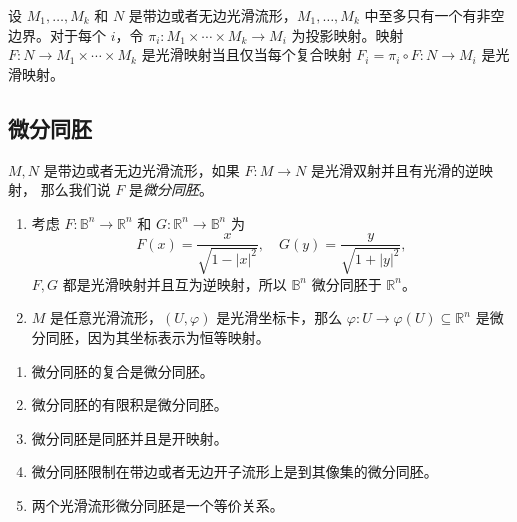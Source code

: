 \documentclass[fontset=none]{Notes}
\begin{document}
\begin{proposition}
  设 $M_1,\dots,M_k$ 和 $N$ 是带边或者无边光滑流形，$M_1,\dots,M_k$
  中至多只有一个有非空边界。对于每个 $i$，令 $\pi_i:M_1\times\cdots\times M_k\to M_i$
  为投影映射。映射 $F:N\to M_1\times\cdots\times M_k$ 是光滑映射当且仅当每个复合映射
  $F_i=\pi_i\circ F:N\to M_i$ 是光滑映射。
\end{proposition}

\subsection{微分同胚}

$M,N$ 是带边或者无边光滑流形，如果 $F:M\to N$ 是光滑双射并且有光滑的逆映射，
那么我们说 $F$ 是\emph{微分同胚}。

\begin{example}[微分同胚]
  \mbox{}
  \begin{enumerate}
    \item 考虑 $F:\mathbb{B}^n\to\mathbb{R}^n$ 和 $G:\mathbb{R}^n\to\mathbb{B}^n$
    为
    \[
      F(x)=\frac{x}{\sqrt{1-|x|^2}},\quad G(y)=\frac{y}{\sqrt{1+|y|^2}},
    \]
    $F,G$ 都是光滑映射并且互为逆映射，所以 $\mathbb{B}^n$ 微分同胚于 $\mathbb{R}^n$。
    \item $M$ 是任意光滑流形，$(U,\varphi)$ 是光滑坐标卡，那么 $\varphi:U\to\varphi(U)\subseteq\mathbb{R}^n$
    是微分同胚，因为其坐标表示为恒等映射。
  \end{enumerate}
\end{example}

\begin{proposition}[微分同胚的性质]
  \mbox{}
  \begin{enumerate}
    \item 微分同胚的复合是微分同胚。
    \item 微分同胚的有限积是微分同胚。
    \item 微分同胚是同胚并且是开映射。
    \item 微分同胚限制在带边或者无边开子流形上是到其像集的微分同胚。
    \item 两个光滑流形微分同胚是一个等价关系。
  \end{enumerate}
\end{proposition}
\end{document}
